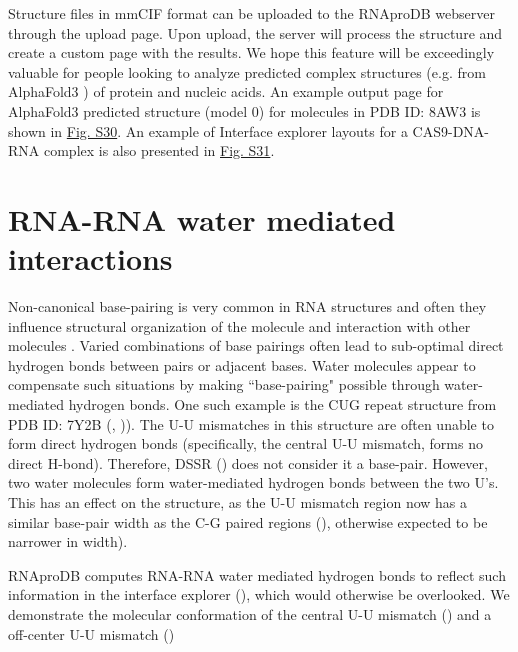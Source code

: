 Structure files in mmCIF format can be uploaded to the RNAproDB webserver through the upload page. Upon upload, the server will process the structure and create a custom page with the results. We hope this feature will be exceedingly valuable for people looking to analyze predicted complex structures (e.g. from AlphaFold3 \citep{Abramson2024}) of protein and nucleic acids. An example output page for AlphaFold3 predicted structure (model 0) for molecules in PDB ID: 8AW3 is shown in \hyperref[fig:rnaprodbS2]{Fig. S30}. An example of Interface explorer layouts for a CAS9-DNA-RNA complex  is also presented in \hyperref[fig:rnaprodbS3]{Fig. S31}.

\section{RNA-RNA water mediated interactions}

Non-canonical base-pairing is very common in RNA structures and often they influence structural organization of the molecule and interaction with other molecules \citep{olson2019effects}. Varied combinations of base pairings often lead to sub-optimal direct hydrogen bonds between pairs or adjacent bases. Water molecules appear to compensate such situations by making ``base-pairing" possible through water-mediated hydrogen bonds. One such example is the CUG repeat structure from PDB ID: 7Y2B (\citep{wang2023structural}, )). The U-U mismatches in this structure are often unable to form direct hydrogen bonds (specifically, the central U-U mismatch, forms no direct H-bond). Therefore, DSSR (\citep{Lu2015}) does not consider it a base-pair. However, two water molecules form water-mediated hydrogen bonds between the two U's. This has an effect on the structure, as the U-U mismatch region now has a similar base-pair width as the C-G paired regions (), otherwise expected to be narrower in width). 

RNAproDB computes RNA-RNA water mediated hydrogen bonds to reflect such information in the interface explorer (), which would otherwise be overlooked. We demonstrate the molecular conformation of the central U-U mismatch () and a off-center U-U mismatch ()

